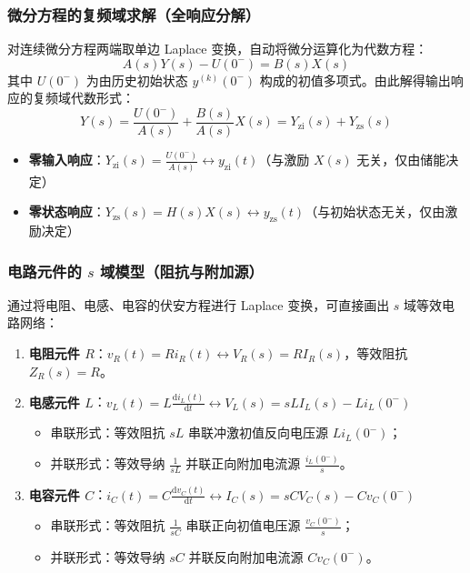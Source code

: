 \documentclass[11pt,a4paper,fontset=fandol]{ctexart}
\theoremstyle{remark}
\begin{document}
\subsubsection{微分方程的复频域求解（全响应分解）}
对连续微分方程两端取单边 Laplace 变换，自动将微分运算化为代数方程：
\begin{equation}
    A(s)Y(s) - U(0^-) = B(s)X(s)
\end{equation}
其中 $U(0^-)$ 为由历史初始状态 $y^{(k)}(0^-)$ 构成的初值多项式。由此解得输出响应的复频域代数形式：
\begin{equation}
    Y(s) = \frac{U(0^-)}{A(s)} + \frac{B(s)}{A(s)}X(s) = Y_{\mathrm{zi}}(s) + Y_{\mathrm{zs}}(s)
\end{equation}
\begin{itemize}
    \item \textbf{零输入响应}：$Y_{\mathrm{zi}}(s) = \frac{U(0^-)}{A(s)} \longleftrightarrow y_{\mathrm{zi}}(t)$（与激励 $X(s)$ 无关，仅由储能决定）
    \item \textbf{零状态响应}：$Y_{\mathrm{zs}}(s) = H(s)X(s) \longleftrightarrow y_{\mathrm{zs}}(t)$（与初始状态无关，仅由激励决定）
\end{itemize}

\subsubsection{电路元件的 $s$ 域模型（阻抗与附加源）}
通过将电阻、电感、电容的伏安方程进行 Laplace 变换，可直接画出 $s$ 域等效电路网络：
\begin{enumerate}
    \item \textbf{电阻元件 $R$}：$v_R(t) = R i_R(t) \longleftrightarrow V_R(s) = R I_R(s)$，等效阻抗 $Z_R(s) = R$。
    \item \textbf{电感元件 $L$}：$v_L(t) = L \frac{\mathrm{d}i_L(t)}{\mathrm{d}t} \longleftrightarrow V_L(s) = sL I_L(s) - L i_L(0^-)$
    \begin{itemize}
        \item 串联形式：等效阻抗 $sL$ 串联冲激初值反向电压源 $L i_L(0^-)$；
        \item 并联形式：等效导纳 $\frac{1}{sL}$ 并联正向附加电流源 $\frac{i_L(0^-)}{s}$。
    \end{itemize}
    \item \textbf{电容元件 $C$}：$i_C(t) = C \frac{\mathrm{d}v_C(t)}{\mathrm{d}t} \longleftrightarrow I_C(s) = sC V_C(s) - C v_C(0^-)$
    \begin{itemize}
        \item 串联形式：等效阻抗 $\frac{1}{sC}$ 串联正向初值电压源 $\frac{v_C(0^-)}{s}$；
        \item 并联形式：等效导纳 $sC$ 并联反向附加电流源 $C v_C(0^-)$。
    \end{itemize}
\end{enumerate}
\end{document}
